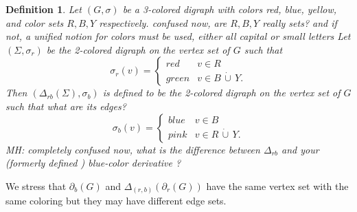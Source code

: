 \documentclass[final,3p,times]{elsarticle}
\newtheorem{definition}{Definition}[section]
\newcommand{\TODO}[1]{\begingroup\color{red}#1\endgroup}
\newcommand{\OLD}[1]{\begingroup\tiny\color{gray}#1\endgroup}
\begin{document}



\begin{definition}

Let $(G,\sigma)$ be a 3-colored digraph with colors red, blue, yellow, and color sets $R,B,Y$ respectively.
\TODO{confused now, are $R,B,Y$ really sets? and if not, a unified notion for colors must be used, either all
capital or small letters }
Let $(\Sigma,\sigma_r)$ be the 2-colored digraph on the vertex set of $G$ such that
\begin{equation}\label{def:sigma-r}
\sigma_r(v)= \begin{cases} 
      red & v\in R \\
     green & v\in B \,\dot{\cup}\, Y.
   \end{cases}
\end{equation}
Then
$(\Delta_{rb}(\Sigma),\sigma_b)$ is defined to be the 2-colored digraph on the vertex set of $G$ such that
\TODO{what are its edges?}
\begin{equation}\label{def:sigma-b}
\sigma_b(v)= \begin{cases} 
    blue & v\in B \\
     pink & v\in R \,\dot{\cup}\, Y.
   \end{cases}
\end{equation} \TODO{MH: completely confused now, what is the difference between 
$\Delta_{rb}$ and your (formerly defined ) blue-color derivative ?  }
 \end{definition}
 
\OLD{We stress that $\partial_b(G)$ and $\Delta_{(r,b)}(\partial_r(G))$ have the same vertex set with the same coloring 
but they may have different edge sets. }
\end{document}
